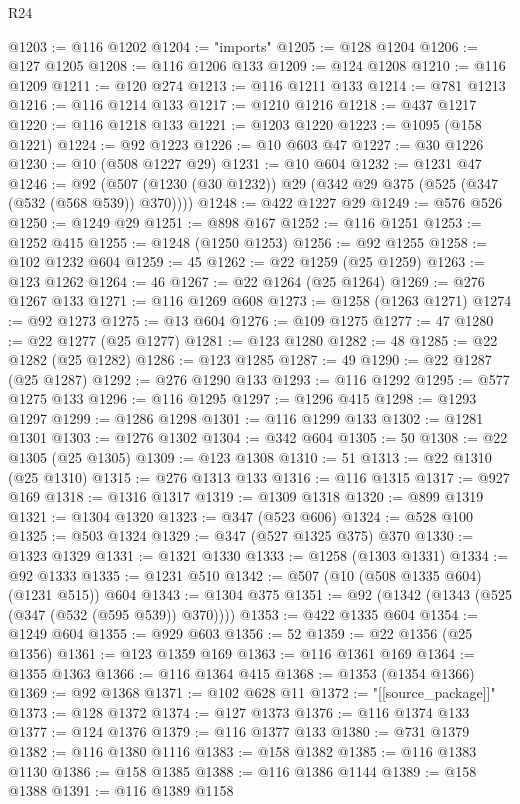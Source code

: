 \begin{lexlean}{R24}
\begin{coremodule}
@1203 := @116 @1202
@1204 := "imports"
@1205 := @128 @1204
@1206 := @127 @1205
@1208 := @116 @1206 @133
@1209 := @124 @1208
@1210 := @116 @1209
@1211 := @120 @274
@1213 := @116 @1211 @133
@1214 := @781 @1213
@1216 := @116 @1214 @133
@1217 := @1210 @1216
@1218 := @437 @1217
@1220 := @116 @1218 @133
@1221 := @1203 @1220
@1223 := @1095 (@158 @1221)
@1224 := @92 @1223
@1226 := @10 @603 @47
@1227 := @30 @1226
@1230 := @10 (@508 @1227 @29)
@1231 := @10 @604
@1232 := @1231 @47
@1246 := @92 (@507 (@1230 (@30 @1232)) @29 (@342 @29 @375 (@525 (@347 (@532 (@568 @539)) @370))))
@1248 := @422 @1227 @29
@1249 := @576 @526
@1250 := @1249 @29
@1251 := @898 @167
@1252 := @116 @1251
@1253 := @1252 @415
@1255 := @1248 (@1250 @1253)
@1256 := @92 @1255
@1258 := @102 @1232 @604
@1259 := 45
@1262 := @22 @1259 (@25 @1259)
@1263 := @123 @1262
@1264 := 46
@1267 := @22 @1264 (@25 @1264)
@1269 := @276 @1267 @133
@1271 := @116 @1269 @608
@1273 := @1258 (@1263 @1271)
@1274 := @92 @1273
@1275 := @13 @604
@1276 := @109 @1275
@1277 := 47
@1280 := @22 @1277 (@25 @1277)
@1281 := @123 @1280
@1282 := 48
@1285 := @22 @1282 (@25 @1282)
@1286 := @123 @1285
@1287 := 49
@1290 := @22 @1287 (@25 @1287)
@1292 := @276 @1290 @133
@1293 := @116 @1292
@1295 := @577 @1275 @133
@1296 := @116 @1295
@1297 := @1296 @415
@1298 := @1293 @1297
@1299 := @1286 @1298
@1301 := @116 @1299 @133
@1302 := @1281 @1301
@1303 := @1276 @1302
@1304 := @342 @604
@1305 := 50
@1308 := @22 @1305 (@25 @1305)
@1309 := @123 @1308
@1310 := 51
@1313 := @22 @1310 (@25 @1310)
@1315 := @276 @1313 @133
@1316 := @116 @1315
@1317 := @927 @169
@1318 := @1316 @1317
@1319 := @1309 @1318
@1320 := @899 @1319
@1321 := @1304 @1320
@1323 := @347 (@523 @606)
@1324 := @528 @100
@1325 := @503 @1324
@1329 := @347 (@527 @1325 @375) @370
@1330 := @1323 @1329
@1331 := @1321 @1330
@1333 := @1258 (@1303 @1331)
@1334 := @92 @1333
@1335 := @1231 @510
@1342 := @507 (@10 (@508 @1335 @604) (@1231 @515)) @604
@1343 := @1304 @375
@1351 := @92 (@1342 (@1343 (@525 (@347 (@532 (@595 @539)) @370))))
@1353 := @422 @1335 @604
@1354 := @1249 @604
@1355 := @929 @603
@1356 := 52
@1359 := @22 @1356 (@25 @1356)
@1361 := @123 @1359 @169
@1363 := @116 @1361 @169
@1364 := @1355 @1363
@1366 := @116 @1364 @415
@1368 := @1353 (@1354 @1366)
@1369 := @92 @1368
@1371 := @102 @628 @11
@1372 := "[[source_package]]"
@1373 := @128 @1372
@1374 := @127 @1373
@1376 := @116 @1374 @133
@1377 := @124 @1376
@1379 := @116 @1377 @133
@1380 := @731 @1379
@1382 := @116 @1380 @1116
@1383 := @158 @1382
@1385 := @116 @1383 @1130
@1386 := @158 @1385
@1388 := @116 @1386 @1144
@1389 := @158 @1388
@1391 := @116 @1389 @1158

\end{coremodule}
\end{lexlean}
